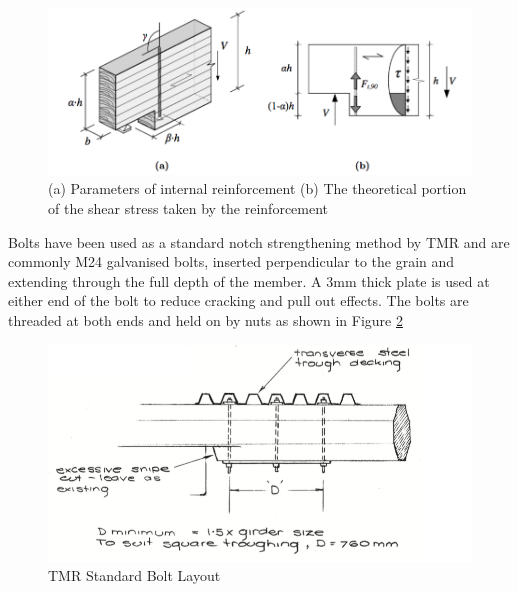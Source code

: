 \documentclass[11pt,a4paper]{article}
\numberwithin{equation}{subsection}
\begin{document}
	\begin{center}
		\begin{figure}[h]
			\includegraphics[scale=0.5]{Notch_Screw}
			\caption{(a) Parameters of internal reinforcement  (b) The theoretical portion of the shear stress taken by the reinforcement  \cite{jockwer_structural_2014}}
			\label{fig:Internal}
		\end{figure}
	\end{center}
	
\vspace*{\baselineskip}
	
\noindent
Bolts have been used as a standard notch strengthening method by TMR and are commonly M24 galvanised bolts, inserted perpendicular to the grain and extending through the full depth of the member. A 3mm thick plate is used at either end of the bolt to reduce cracking and pull out effects. The bolts are threaded at both ends and held on by nuts as shown in Figure \ref{fig:Internal2} \cite{_timber_2005}

	\begin{center}
		\begin{figure}[h]
			\includegraphics[scale=0.5]{Bolt_Layout}
			\caption{TMR Standard Bolt Layout \cite{_timber_2005}}
			\label{fig:Internal2}
		\end{figure}
	\end{center}
	
\end{document}
